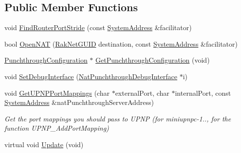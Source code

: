 \subsection*{Public Member Functions}
\begin{DoxyCompactItemize}
\item 
void \hyperlink{class_rak_net_1_1_nat_punchthrough_client_ab830402dee86fc7b557e098f4ccdd4f1}{Find\-Router\-Port\-Stride} (const \hyperlink{struct_rak_net_1_1_system_address}{System\-Address} \&facilitator)
\item 
bool \hyperlink{class_rak_net_1_1_nat_punchthrough_client_a92dbda7c976d5973c5cd6a3e0aea95c0}{Open\-N\-A\-T} (\hyperlink{struct_rak_net_1_1_rak_net_g_u_i_d}{Rak\-Net\-G\-U\-I\-D} destination, const \hyperlink{struct_rak_net_1_1_system_address}{System\-Address} \&facilitator)
\item 
\hyperlink{struct_rak_net_1_1_punchthrough_configuration}{Punchthrough\-Configuration} $\ast$ \hyperlink{class_rak_net_1_1_nat_punchthrough_client_a6131cc61e5af13399db4358fbb7b0d15}{Get\-Punchthrough\-Configuration} (void)
\item 
void \hyperlink{class_rak_net_1_1_nat_punchthrough_client_a7bc339aacd4c7f355ebfbab17059c4a0}{Set\-Debug\-Interface} (\hyperlink{struct_rak_net_1_1_nat_punchthrough_debug_interface}{Nat\-Punchthrough\-Debug\-Interface} $\ast$i)
\item 
\hypertarget{class_rak_net_1_1_nat_punchthrough_client_a621163bc6be3e7d6f6c6b4d9c8e5f938}{void \hyperlink{class_rak_net_1_1_nat_punchthrough_client_a621163bc6be3e7d6f6c6b4d9c8e5f938}{Get\-U\-P\-N\-P\-Port\-Mappings} (char $\ast$external\-Port, char $\ast$internal\-Port, const \hyperlink{struct_rak_net_1_1_system_address}{System\-Address} \&nat\-Punchthrough\-Server\-Address)}\label{class_rak_net_1_1_nat_punchthrough_client_a621163bc6be3e7d6f6c6b4d9c8e5f938}

\begin{DoxyCompactList}\small\item\em Get the port mappings you should pass to U\-P\-N\-P (for miniupnpc-\/1.., for the function U\-P\-N\-P\-\_\-\-Add\-Port\-Mapping) \end{DoxyCompactList}\item 
\hypertarget{class_rak_net_1_1_nat_punchthrough_client_afdb000c77864073b54260e4e882a3010}{virtual void \hyperlink{class_rak_net_1_1_nat_punchthrough_client_afdb000c77864073b54260e4e882a3010}{Update} (void)}\label{class_rak_net_1_1_nat_punchthrough_client_afdb000c77864073b54260e4e882a3010}


\end{DoxyCompactItemize}
